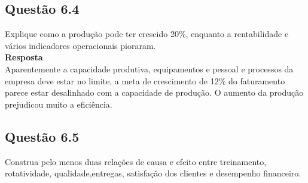 \subsection{Questão 6.4}
Explique como a produção pode ter crescido 20\%, enquanto a rentabilidade e vários indicadores operacionais pioraram.\\
\textbf{Resposta}\\
Aparentemente a capacidade produtiva, equipamentos e pessoal e processos da empresa deve estar no limite, a meta de crescimento de 12\% do faturamento parece estar desalinhado com a capacidade de produção. O aumento da produção prejudicou muito a eficiência.
\subsection{Questão 6.5}
Construa pelo menos duas relações de causa e efeito entre treinamento, rotatividade, qualidade,entregas, satisfação dos clientes e desempenho financeiro.
